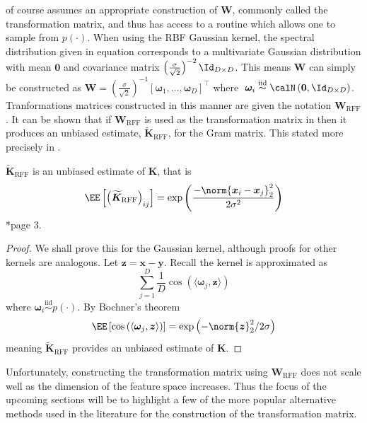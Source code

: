  of course assumes an appropriate construction of $\bm{W}$, commonly called the transformation matrix, and thus has access to a routine which allows one to sample from $p(\cdot)$. When using the RBF Gaussian kernel, the spectral distribution given in equation   corresponds to a multivariate Gaussian distribution with mean $\bm{0}$ and covariance matrix $\left( \frac{\sigma}{\sqrt{2}} \right)^{-2} \Id_{D \times D}$. This means $\bm{W}$ can simply be constructed as $\bm{W} = \left( \frac{\sigma}{\sqrt{2}} \right)^{-1} \left[ \bm{\omega}_1 ,\ldots , \bm{\omega}_D \right]^{\intercal}$ where $\; \bm{\omega}_i \stackrel{\text{iid}}{\sim} \calN \left( \bm{0} , \Id_{D \times D} \right)$. Tranformations matrices constructed in this manner are given the notation $\bm{W}_{\text{RFF}}$. It can be shown that if $\bm{W}_{\text{RFF}}$ is used as the transformation matrix in  then it produces an unbiased estimate, $\bm{\widetilde{K}}_{\text{RFF}}$, for the Gram matrix. This stated more precisely in .

\begin{lem} \label{lem: rff-unbiased}
    $\bm{\widetilde{K}}_{\text{RFF}}$ is an unbiased estimate of $\bm{K}$, that is
    \[
        \EE \left[ \left( \bm{\widetilde{K}}_{\text{RFF}} \right)_{ij} \right] = \exp \left( \frac{- \norm{\bm{x}_i - {\bm{x}_j}}_{2}^{2}}{2 \sigma^2} \right)
    \] \cite{YuFelixX2016ORF}*{page 3}.
\end{lem}

\begin{proof}
    We shall prove this for the Gaussian kernel, although proofs for other kernels are analogous. Let $\bm{z} = \bm{x} - \bm{y}$. Recall the kernel is approximated as
    \[
        \sum_{j=1}^{D} \frac{1}{D} \cos \left( \langle \bm{\omega}_j , \bm{z} \rangle \right)
    \]
    where $\bm{\omega}_i \stackrel{\text{iid}}{\sim} p(\cdot)$. By Bochner's theorem
    \[
        \EE \left[ \cos \left( \langle \bm{\omega}_j , \bm{z} \rangle \right) \right] = \exp \left( - \norm{\bm{z}}^2_2 / 2 \sigma \right)
    \]
    meaning $\bm{\widetilde{K}}_{\text{RFF}}$ provides an unbiased estimate of $\bm{K}$.
\end{proof}

Unfortunately, constructing the transformation matrix using $\bm{W}_{\text{RFF}}$ does not scale well as the dimension of the feature space increases. Thus the focus of the upcoming sections will be to highlight a few of the more popular alternative methods used in the literature for the construction of the transformation matrix.